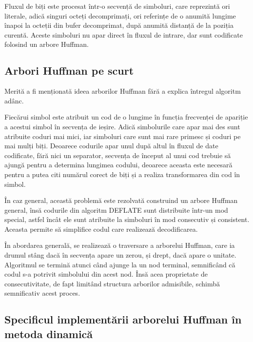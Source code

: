 \documentclass[a4paper,12pt]{report}
\begin{document}
Fluxul de biți este procesat într-o secvență de simboluri,
care reprezintă ori literale, adică singuri octeți decomprimați,
ori referințe de o anumită lungime înapoi la octeții din bufer decomprimat,
după anumită distanță de la poziția curentă.
Aceste simboluri nu apar direct în fluxul de intrare,
dar sunt codificate folosind un arbore Huffman.

\subsection{Arbori Huffman pe scurt}

Merită a fi menționată ideea arborilor Huffman fără a explica întregul algoritm adânc.

Fiecărui simbol este atribuit un cod de o lungime în funcția frecvenței de apariție a acestui simbol
în secvența de ieșire.
Adică simbolurile care apar mai des sunt atribuite coduri mai mici,
iar simboluri care sunt mai rare primesc și coduri pe mai mulți biți.
Deoarece codurile apar unul după altul în fluxul de date codificate,
fără nici un separator, secvența de început al unui cod trebuie să ajungă pentru a determina lungimea codului,
deoarece aceasta este necesară pentru a putea citi numărul corect de biți și a realiza transformarea din cod în simbol.

În caz general, această problemă este rezolvată construind un arbore Huffman general,
însă codurile din algoritm DEFLATE sunt distribuite într-un mod special,
astfel încât ele sunt atribuite la simboluri în mod consecutiv și consistent.
Aceasta permite să simplifice codul care realizează decodificarea.

În abordarea generală, se realizează o traversare a arborelui Huffman,
care ia drumul stâng dacă în secvența apare un zerou, și drept, dacă apare o unitate.
Algoritmul se termină atunci când ajunge la un nod terminal,
semnificând că codul s-a potrivit simbolului din acest nod.
Însă acea proprietate de consecutivitate,
de fapt limitând structura arborilor admisibile,
schimbă semnificativ acest proces.

\subsection{Specificul implementării arborelui Huffman în metoda dinamică}
\end{document}
